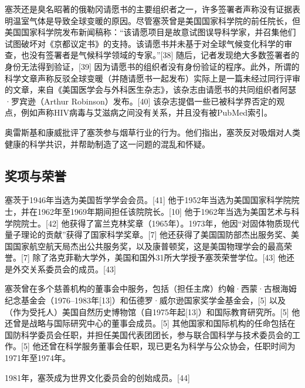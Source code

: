 塞茨还是臭名昭著的俄勒冈请愿书的主要组织者之一，许多签署者声称没有证据表明温室气体是导致全球变暖的原因。尽管塞茨曾是美国国家科学院的前任院长，但美国国家科学院发布新闻稿称：“该请愿项目是故意试图误导科学家，并召集他们试图破坏对《京都议定书》的支持。该请愿书并未基于对全球气候变化科学的审查，也没有签署者是气候科学领域的专家。”[38] 随后，记者发现绝大多数签署者的身份无法得到验证，[39] 因为请愿书的组织者没有身份验证的程序。此外，所谓的科学文章声称反驳全球变暖（并随请愿书一起发布）实际上是一篇未经过同行评审的文章，来自《美国医学会与外科医生杂志》，该杂志由请愿书的共同组织者阿瑟·罗宾逊（Arthur Robinson）发布。[40] 该杂志提倡一些已被科学界否定的观点，例如声称HIV病毒与艾滋病之间没有关系，并且没有被PubMed索引。

奥雷斯基和康威批评了塞茨参与烟草行业的行为。他们指出，塞茨反对吸烟对人类健康的科学共识，并帮助制造了这一问题的混乱和怀疑。
\subsection{奖项与荣誉}  
塞茨于1946年当选为美国哲学学会会员。[41] 他于1952年当选为美国国家科学院院士，并在1962年至1969年期间担任该院院长。[10] 他于1962年当选为美国艺术与科学院院士。[42] 他获得了富兰克林奖章（1965年）。1973年，他因“对固体物质现代量子理论的贡献”获得了国家科学奖章。[7] 他还获得了美国国防部杰出服务奖、美国国家航空航天局杰出公共服务奖，以及康普顿奖，这是美国物理学会的最高荣誉。[7] 除了洛克菲勒大学外，美国和国外31所大学授予塞茨荣誉学位。[43] 他还是外交关系委员会的成员。[43]

塞茨曾在多个慈善机构的董事会中服务，包括（担任主席）约翰·西蒙·古根海姆纪念基金会（1976–1983年[13]）和伍德罗·威尔逊国家奖学金基金会，[5] 以及（作为受托人）美国自然历史博物馆（自1975年起[13]）和国际教育研究所。[5] 他还曾是战略与国际研究中心的董事会成员。[5] 其他国家和国际机构的任命包括在国防科学委员会任职，并担任美国代表团团长，参与联合国科学与技术委员会的工作。[5] 他还曾在科学服务董事会任职，现已更名为科学与公众协会，任职时间为1971年至1974年。

1981年，塞茨成为世界文化委员会的创始成员。[44]